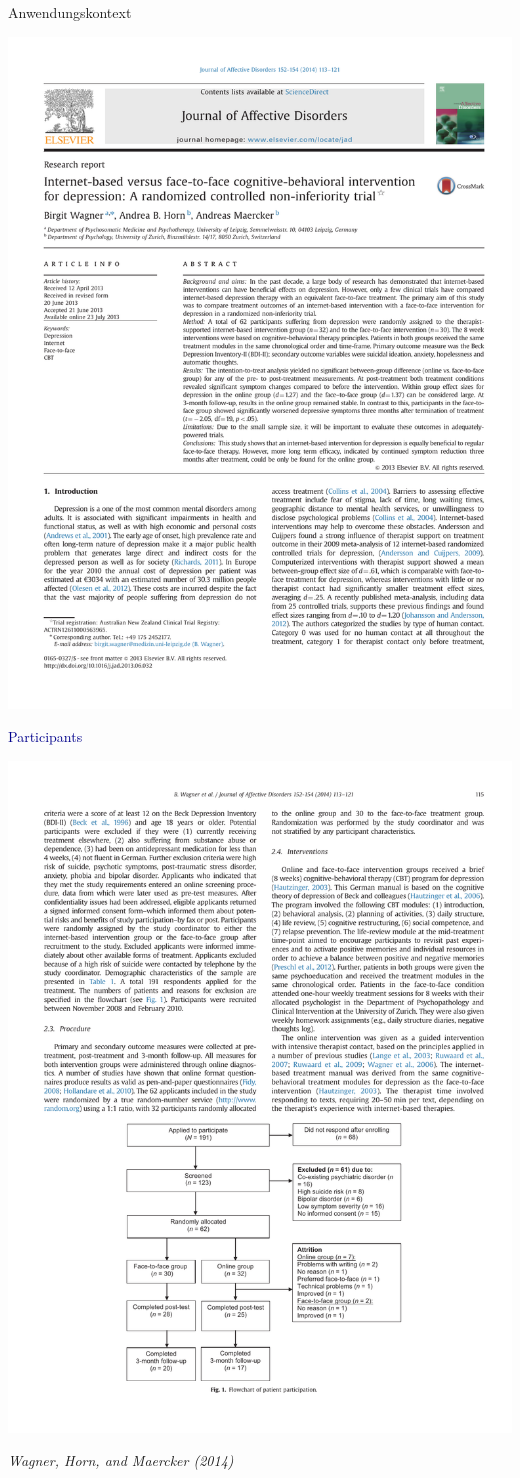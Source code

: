 \documentclass[
  8pt,
  ignorenonframetext,
]{beamer}
\begin{document}
\begin{frame}[t]{Anwendungskontext}
\protect\hypertarget{anwendungskontext-7}{}
\begin{center}\includegraphics[width=0.5\linewidth]{8_Abbildungen/alm_8_article_title} \end{center}
\center

\textcolor{darkblue}{Participants}

\begin{center}\includegraphics[width=0.5\linewidth]{8_Abbildungen/alm_8_article_participants} \end{center}
\flushright
\footnotesize

\emph{Wagner, Horn, and Maercker (2014)}
\end{frame}
\end{document}
